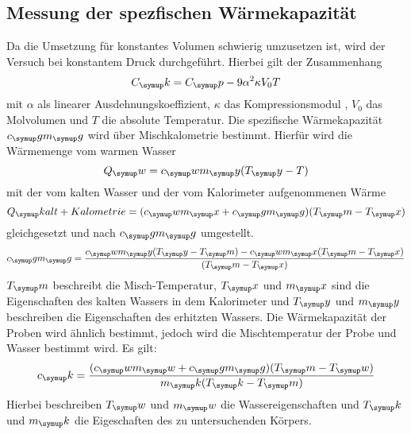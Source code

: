 \subsection{Messung der spezfischen Wärmekapazität}
Da die Umsetzung für konstantes Volumen schwierig umzusetzen ist, wird der
Versuch bei konstantem Druck durchgeführt. Hierbei gilt der Zusammenhang
\begin{equation}
  C_\su{k} = C_\su{p}-9\alpha^2\kappa V_0T
  \label{eq:mol}
\end{equation}
mit $\alpha$ als linearer Ausdehnungskoeffizient, $\kappa$ das Kompressionsmodul
, $V_0$ das Molvolumen und $T$ die absolute Temperatur. Die spezifische
Wärmekapazität $c_\su{g}m_\su{g}$ wird über Mischkalometrie bestimmt.
Hierfür wird die Wärmemenge vom warmen Wasser
\begin{equation}
  Q_\su{w}=c_\su{w}m_\su{y}(T_\su{y}-T)
\end{equation}
mit der vom kalten Wasser und der vom Kalorimeter aufgenommenen Wärme
\begin{equation}
  Q_\su{kalt+Kalometrie}=(c_\su{w}m_\su{x}+c_\su{g}m_\su{g})(T_\su{m}-T_\su{x})
\end{equation}
gleichgesetzt und nach $c_\su{g}m_\su{g}$ umgestellt.
\begin{equation}
  c_\su{g}m_\su{g}=\frac{c_\su{w}m_\su{y}(T_\su{y}-T_\su{m})-c_\su{w}m_\su{x}
  (T_\su{m}-T_\su{x})}{(T_\su{m}-T_\su{x})}
  \label{eq:kalo}
\end{equation}
$T_\su{m}$ beschreibt die Misch-Temperatur, $T_\su{x}$ und $m_\su{x}$ sind die
Eigenschaften des kalten Wassers in dem Kalorimeter und $T_\su{y}$ und $m_\su{y}$
beschreiben die Eigenschaften des erhitzten Wassers.
Die Wärmekapazität der Proben wird ähnlich bestimmt, jedoch wird die
Mischtemperatur der Probe und Wasser bestimmt wird. Es gilt:
\begin{equation}
  c_\su{k}=\frac{(c_\su{w}m_\su{w}+c_\su{g}m_\su{g})(T_\su{m}-T_\su{w})}
  {m_\su{k}(T_\su{k}-T_\su{m})}
  \label{eq:probe}
\end{equation}
Hierbei beschreiben $T_\su{w}$ und $m_\su{w}$ die Wassereigenschaften und $T_\su{k}$
und $m_\su{k}$ die Eigeschaften des zu untersuchenden Körpers.
